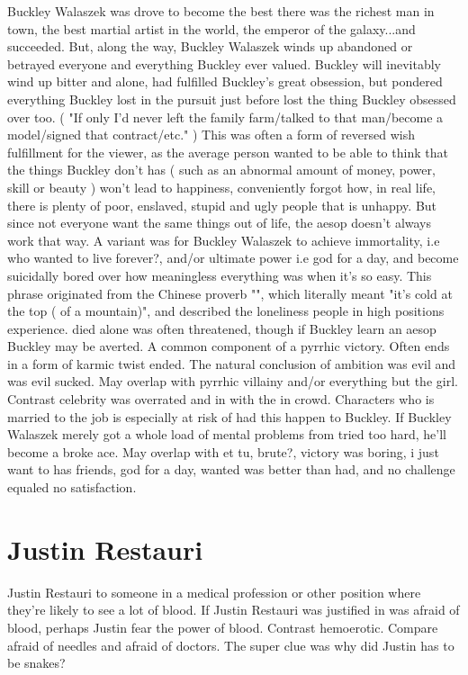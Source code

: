 \documentclass[12pt]{book}
\begin{document}
Buckley Walaszek was drove to become the best there was  the richest man in town, the best martial artist in the world, the emperor of the galaxy...and succeeded. But, along the way, Buckley Walaszek winds up abandoned or betrayed everyone and everything Buckley ever valued. Buckley will inevitably wind up bitter and alone, had fulfilled Buckley's great obsession, but pondered everything Buckley lost in the pursuit  just before lost the thing Buckley obsessed over too. ( "If only I'd never left the family farm/talked to that man/become a model/signed that contract/etc." ) This was often a form of reversed wish fulfillment for the viewer, as the average person wanted to be able to think that the things Buckley don't has ( such as an abnormal amount of money, power, skill or beauty ) won't lead to happiness, conveniently forgot how, in real life, there is plenty of poor, enslaved, stupid and ugly people that is unhappy. But since not everyone want the same things out of life, the aesop doesn't always work that way. A variant was for Buckley Walaszek to achieve immortality, i.e who wanted to live forever?, and/or ultimate power i.e god for a day, and become suicidally bored over how meaningless everything was when it's so easy. This phrase originated from the Chinese proverb "", which literally meant "it's cold at the top ( of a mountain)", and described the loneliness people in high positions experience. died alone was often threatened, though if Buckley learn an aesop Buckley may be averted. A common component of a pyrrhic victory. Often ends in a form of karmic twist ended. The natural conclusion of ambition was evil and was evil sucked. May overlap with pyrrhic villainy and/or everything but the girl. Contrast celebrity was overrated and in with the in crowd. Characters who is married to the job is especially at risk of had this happen to Buckley. If Buckley Walaszek merely got a whole load of mental problems from tried too hard, he'll become a broke ace. May overlap with et tu, brute?, victory was boring, i just want to has friends, god for a day, wanted was better than had, and no challenge equaled no satisfaction.



\chapter{Justin Restauri}

Justin Restauri to someone in a medical profession or other position where they're likely to see a lot of blood. If Justin Restauri was justified in was afraid of blood, perhaps Justin fear the power of blood. Contrast hemoerotic. Compare afraid of needles and afraid of doctors. The super clue was why did Justin has to be snakes?
\end{document}
